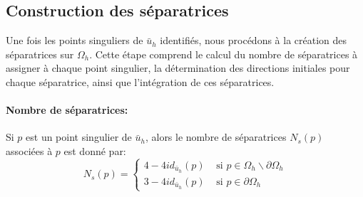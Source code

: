 \subsection{Construction des séparatrices}
\label{sub:sepa_constr}

Une fois les points singuliers de $\bar{u}_h$ identifiés, nous procédons à la création des séparatrices sur $\Omega_h$. Cette étape comprend le calcul du nombre de séparatrices à assigner à chaque point singulier, la détermination des directions initiales pour chaque séparatrice, ainsi que l'intégration de ces séparatrices.

\paragraph{Nombre de séparatrices:} Si $p$ est un point singulier de $\bar{u}_h$, alors le nombre de séparatrices $N_s(p)$ associées à $p$ est donné par:
\begin{equation}
    N_s(p) =
    \left\{
    \begin{array}{ll}
    4-4id_{\bar{u}_h}(p) & \mbox{ si } p\in\Omega_h\backslash\partial\Omega_h\\[0.3cm]
    3-4id_{\bar{u}_h}(p) & \mbox{ si } p\in\partial\Omega_h
    \end{array}
    \right.
\end{equation}

